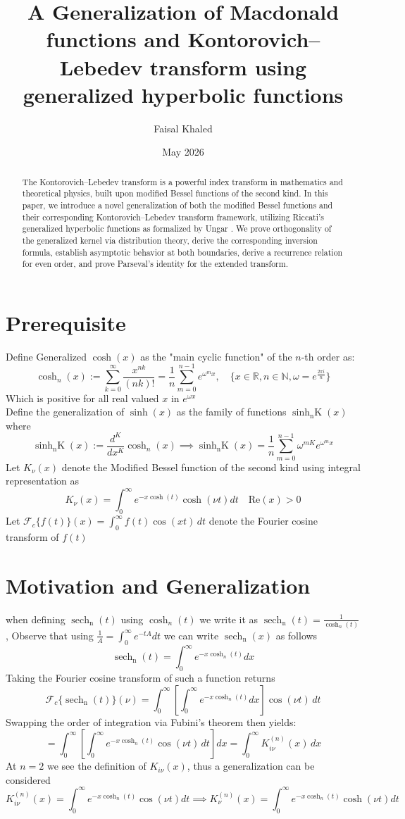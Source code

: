 \documentclass{article}
\title{A Generalization of Macdonald functions and  Kontorovich–Lebedev transform using generalized hyperbolic functions}
\author{Faisal Khaled}
\date{May 2026}
\DeclareMathOperator{\sech}{sech}
\newcommand{\NotDefinedsinh}[2]{\operatorname{\sinh_{#1}\text{#2}}}
\newcommand{\NotDefinedcosh}[2]{\operatorname{cosh}_{#1}\text{#2}}
\newcommand{\NotDefinedsech}[2]{\operatorname{\sech_{#1}\text{#2}}}
\begin{document}
    
\maketitle
\begin{abstract}
The Kontorovich–Lebedev transform is a powerful index transform in mathematics and theoretical physics, built upon modified Bessel functions of the second kind. In this paper, we introduce a novel generalization of both the modified Bessel functions and their corresponding Kontorovich–Lebedev transform framework, utilizing Riccati's generalized hyperbolic functions as formalized by Ungar \cite{Ungar1982}. We prove orthogonality of the generalized kernel via distribution theory, derive the corresponding inversion formula, establish asymptotic behavior at both boundaries, derive a recurrence relation for even order, and prove Parseval's identity for the extended transform.
\end{abstract}
\tableofcontents
\section{Prerequisite}
Define Generalized $\cosh(x)$ as the "main cyclic function" of the $n$-th order as\cite{Ungar1982}: 
\[\NotDefinedcosh{n}{}(x):=\sum_{k=0}^\infty \frac{x^{nk}}{(nk)!}=\frac{1}{n}\sum_{m=0}^{n-1}e^{\omega^m x}, 
\quad \{x\in \mathbb{R},n\in\mathbb{N},\omega = e^{\frac{2\pi i}{n}}\}\]
Which is positive for all real valued $x$ in $e^{\omega x}$\\
Define the generalization of $\sinh(x)$ as the family of functions $\NotDefinedsinh{n}{K}(x)$ where 
\[\NotDefinedsinh{n}{K}(x):=\frac{d^K}{dx^K}\NotDefinedcosh{n}{}(x) \implies \NotDefinedsinh{n}{K}(x) =\frac{1}{n}\sum_{m=0}^{n-1}\omega^{mK}e^{\omega^m x}\]
Let $K_{\nu}(x)$ denote the Modified Bessel function of the second kind using integral representation as \cite{NIST:2010}
\[K_{\nu}(x) = \int_{0}^{\infty}e^{-x\cosh(t)}\cosh(\nu t)dt \quad \text{Re}(x)>0\]
Let $\mathcal{F}_c\{f(t)\}(x) = \int_0^\infty f(t) \cos(x t) \, dt$ denote the Fourier cosine transform of $f(t)$
\section{Motivation and Generalization}
when defining $\NotDefinedsech{n}{}(t)$ using $\NotDefinedcosh{n}{}(t)$ we write it as $\NotDefinedsech{n}{}(t) = \frac{1}{\NotDefinedcosh{n}{}(t)}$, Observe that using $\frac{1}{A} = \int_{0}^{\infty}e^{-tA}dt$ we can write $\NotDefinedsech{n}{}(x)$ as follows
\[\NotDefinedsech{n}{}(t) = \int_{0}^{\infty}e^{-x\NotDefinedcosh{n}{}(t)}dx\]
Taking the Fourier cosine transform of such a function returns
\[\mathcal{F}_c\{\NotDefinedsech{n}{}(t)\}(\nu) = \int_{0}^{\infty} \left[ \int_{0}^{\infty}e^{-x\cosh_n(t)}dx \right] \cos(\nu t) \, dt\]
Swapping the order of integration via Fubini's theorem then yields:
\[= \int_{0}^{\infty} \left[ \int_{0}^{\infty}e^{-x\cosh_n(t)}\cos(\nu t) \, dt \right] dx = \int_{0}^{\infty} K_{i\nu}^{(n)}(x) \, dx\]
At $n=2$ we see the definition of $K_{i\nu}(x)$, thus a generalization can be considered
\[K_{i\nu}^{(n)}(x)=\int_{0}^{\infty}e^{-x\NotDefinedcosh{n}{}(t)}\cos(\nu t)dt \implies K_{\nu}^{(n)}(x)=\int_{0}^{\infty}e^{-x\NotDefinedcosh{n}{}(t)}\cosh(\nu t)dt\]
\end{document}

